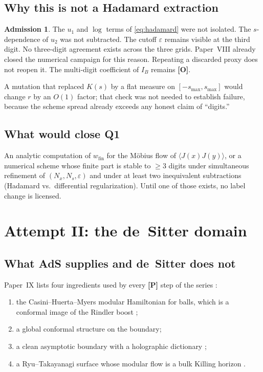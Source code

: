 \documentclass[11pt]{article}
\theoremstyle{definition}
\newtheorem*{admission}{Admission}
\newcommand{\pP}{\textbf{[P]}}
\newcommand{\pO}{\textbf{[O]}}
\newcommand{\IB}{I_B}
\begin{document}
\subsection{Why this is not a Hadamard extraction}

\begin{admission}
The $u_1$ and $\log$ terms of \eqref{eq:hadamard} were not isolated.
The $s$-dependence of $u_2$ was not subtracted. The cutoff
$\varepsilon$ remains visible at the third digit. No three-digit
agreement exists across the three grids. Paper~VIII already closed
the numerical campaign for this reason. Repeating a discarded proxy
does not reopen it. The multi-digit coefficient of $\IB$ remains
\pO{}.
\end{admission}

A mutation that replaced $K(s)$ by a flat measure on $[-s_{\max},s_{\max}]$
would change $r$ by an $O(1)$ factor; that check was not needed to
establish failure, because the scheme spread already exceeds any
honest claim of ``digits.''

\subsection{What would close Q1}

An analytic computation of $w_{\mathrm{fin}}$ for the M\"obius flow
of $\langle J(x)J(y)\rangle$, or a numerical scheme whose finite part
is stable to $\ge 3$ digits under simultaneous refinement of
$(N_x,N_s,\varepsilon)$ and under at least two inequivalent
subtractions (Hadamard vs.\ differential regularization). Until one
of those exists, no label change is licensed.

\section{Attempt II: the de~Sitter domain}
\label{sec:ds}

\subsection{What AdS supplies and de~Sitter does not}

Paper~IX lists four ingredients used by every \pP{} step of the
series \cite{McGwierIX}:

\begin{enumerate}[leftmargin=1.6em]
\item the Casini--Huerta--Myers modular Hamiltonian for balls, which
is a conformal image of the Rindler boost \cite{CHM2011};
\item a global conformal structure on the boundary;
\item a clean asymptotic boundary with a holographic dictionary
\cite{Maldacena1998};
\item a Ryu--Takayanagi surface whose modular flow is a bulk Killing
horizon \cite{RT2006,HRT2007}.
\end{enumerate}
\end{document}
